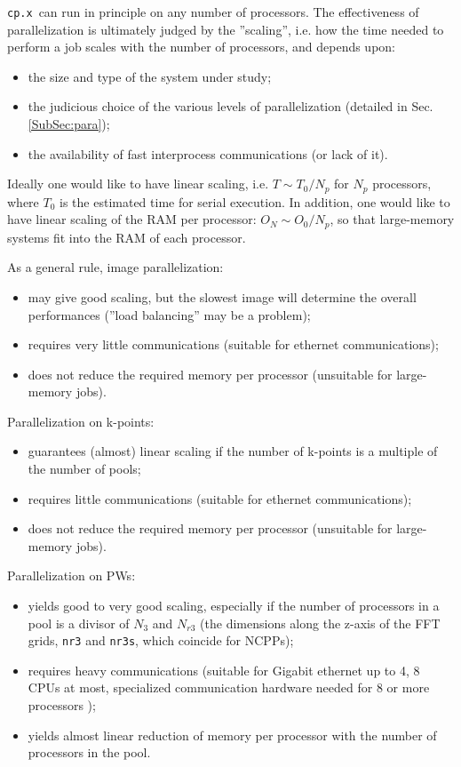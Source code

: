 \documentclass[12pt,a4paper]{article}
\def\cpx{\texttt{cp.x}}
\begin{document}

\cpx\ can run in principle on any number of processors.
The effectiveness of parallelization is ultimately judged by the 
''scaling'', i.e. how the time needed to perform a job scales
 with the number of processors, and depends upon:
\begin{itemize}
\item the size and type of the system under study;
\item the judicious choice of the various levels of parallelization 
(detailed in Sec.\ref{SubSec:para});
\item the availability of fast interprocess communications (or lack of it).
\end{itemize}
Ideally one would like to have linear scaling, i.e. $T \sim T_0/N_p$ for 
$N_p$ processors, where $T_0$ is the estimated time for serial execution.
 In addition, one would like to have linear scaling of
the RAM per processor: $O_N \sim O_0/N_p$, so that large-memory systems
fit into the RAM of each processor.

As a general rule, image parallelization:
\begin{itemize}
\item  may give good scaling, but the slowest image will determine
the overall performances (''load balancing'' may be a problem);
\item requires very little communications (suitable for ethernet 
communications);
\item does not reduce the required memory per processor (unsuitable for 
large-memory jobs).
\end{itemize}
Parallelization on k-points:
\begin{itemize}
\item guarantees (almost) linear scaling if the number of k-points
is a multiple of the number of pools;
\item requires little communications (suitable for ethernet communications);
\item does not reduce the required memory per processor (unsuitable for 
large-memory jobs).
\end{itemize}
Parallelization on PWs:
\begin{itemize}
\item yields good to very good scaling, especially if the number of processors
in a pool is a divisor of $N_3$ and $N_{r3}$ (the dimensions along the z-axis 
of the FFT grids, \texttt{nr3} and \texttt{nr3s}, which coincide for NCPPs);
\item requires heavy communications (suitable for Gigabit ethernet up to 
4, 8 CPUs at most, specialized communication hardware needed for 8 or more
processors );
\item yields almost linear reduction of memory per processor with the number
of processors in the pool.
\end{itemize}
\end{document}

